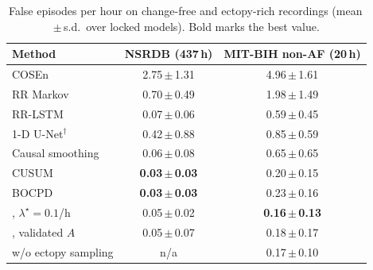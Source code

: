 \begin{table}[!htbp]
\centering
\caption{False episodes per hour on change-free and ectopy-rich recordings (mean\,$\pm$\,s.d.\ over locked models). Bold marks the best value.}
\label{tab:controls}
\footnotesize
\setlength{\tabcolsep}{3pt}
\begin{tabular}{@{}lcc@{}}
\toprule
Method & NSRDB (437\,h) & MIT-BIH non-AF (20\,h)\\
\midrule
COSEn & 2.75\,$\pm$\,1.31 & 4.96\,$\pm$\,1.61\\
RR Markov & 0.70\,$\pm$\,0.49 & 1.98\,$\pm$\,1.49\\
RR-LSTM & 0.07\,$\pm$\,0.06 & 0.59\,$\pm$\,0.45\\
1-D U-Net$^\dagger$ & 0.42\,$\pm$\,0.88 & 0.85\,$\pm$\,0.59\\
Causal smoothing & 0.06\,$\pm$\,0.08 & 0.65\,$\pm$\,0.65\\
CUSUM & \textbf{0.03\,$\pm$\,0.03} & 0.20\,$\pm$\,0.15\\
BOCPD & \textbf{0.03\,$\pm$\,0.03} & 0.23\,$\pm$\,0.16\\
\method{}, $\lambda^\star=0.1$/h & 0.05\,$\pm$\,0.02 & \textbf{0.16\,$\pm$\,0.13}\\
\method{}, validated $A$ & 0.05\,$\pm$\,0.07 & 0.18\,$\pm$\,0.17\\
\method{} w/o ectopy sampling & n/a & 0.17\,$\pm$\,0.10\\
\bottomrule
\end{tabular}
\end{table}
